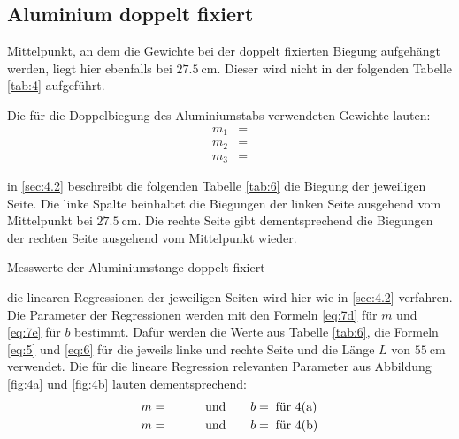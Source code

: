 
\subsection{Aluminium doppelt fixiert}\label{4.4}

\justifying Mittelpunkt, an dem die Gewichte bei der doppelt fixierten Biegung aufgehängt werden, liegt hier ebenfalls bei 
$\SI{27.5}{\centi\meter}$. Dieser wird nicht in der folgenden Tabelle \ref{tab:4} aufgeführt.

Die für die Doppelbiegung des Aluminiumstabs verwendeten Gewichte lauten:
\begin{subequations}\label{eq:26}
\begin{align}
    m_1 &= \text{} \label{eq:26a}\\
    m_2 &= \text{} \label{eq:26b}\\
    m_3 &= \text{} \label{eq:26c}
\end{align}
\end{subequations}

\justifying in \ref{sec:4.2} beschreibt die folgenden Tabelle \ref{tab:6} die Biegung der jeweiligen Seite. Die linke Spalte
beinhaltet die Biegungen der linken Seite ausgehend vom Mittelpunkt bei $\SI{27.5}{\centi\meter}$. Die rechte Seite gibt dementsprechend die Biegungen
der rechten Seite ausgehend vom Mittelpunkt wieder. 
\begin{table}[H]
    \centering
    
    \caption{Messwerte der Aluminiumstange doppelt fixiert}
    \label{tab:6}
\end{table}

\justifying die linearen Regressionen der jeweiligen Seiten wird hier wie in \ref{sec:4.2} verfahren. Die Parameter der Regressionen
werden mit den Formeln \eqref{eq:7d} für $m$ und \eqref{eq:7e} für $b$ bestimmt. Dafür werden die Werte aus Tabelle \ref{tab:6}, die Formeln
\eqref{eq:5} und \eqref{eq:6} für die jeweils linke und rechte Seite und die Länge $L$ von $\SI{55}{\centi\meter}$ verwendet.
Die für die lineare Regression relevanten Parameter aus Abbildung \ref{fig:4a} und \ref{fig:4b} lauten dementsprechend:
\begin{subequations}\label{eq:27}
\begin{align}
    m &= \text{} \qquad &\text{und} \qquad
    &b = \text{} \text{\;für 4(a)}\label{eq:27a}\\
    m &= \text{} \qquad &\text{und} \qquad
    &b = \text{} \text{\;für 4(b)}\label{eq:27b}
\end{align}
\end{subequations}

